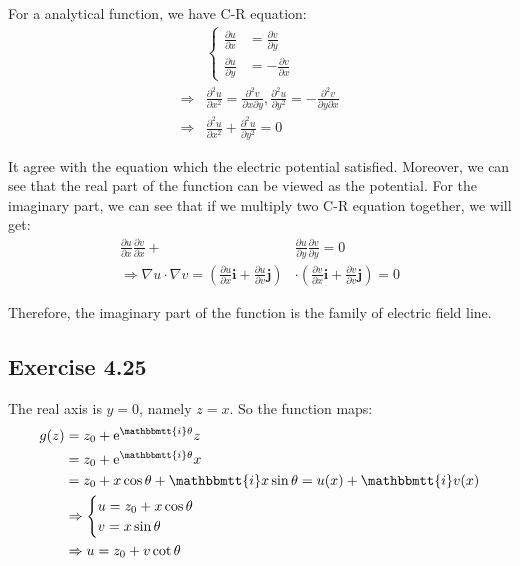 \documentclass[]{ctexart}
\newcommand{\mi}{\mathbbmtt{i}}
\newcommand{\pa}{\partial}
\newcommand{\me}{\mathrm{e}}
\begin{document}
				For a analytical function, we have C-R equation:
					\begin{equation*}
					\begin{aligned}
						&\begin{cases}
							\frac{\pa u}{\pa x}&=\frac{\pa v}{\pa y}\\
							\frac{\pa u}{\pa y}&=-\frac{\pa v}{\pa x}
						\end{cases}\\
						\Rightarrow &\frac{\pa ^2 u}{\pa x^2}=\frac{\pa ^2v}{\pa x \pa y},\frac{\pa ^2 u}{\pa y^2}=-\frac{\pa ^2v}{\pa y \pa x}\\
						\Rightarrow &\frac{\pa^2 u}{\pa x^2}+\frac{\pa^2 u}{\pa y^2}=0
					\end{aligned}
					\end{equation*}
				
				It agree with the equation which the electric potential satisfied. Moreover, we can see that the real part of the function can be viewed as the potential. For the imaginary part, we can see that if we multiply two C-R equation together, we will get:	
					\begin{equation*}
					\begin{aligned}
						\frac{\pa u}{\pa x}\frac{\pa v}{\pa x}+&\frac{\pa u}{\pa y}\frac{\pa v}{\pa y}=0\\
						\Rightarrow \nabla u\cdot \nabla v=\left(\frac{\pa u}{\pa x}\boldsymbol{i}+\frac{\pa u}{\pa v}\boldsymbol{j}\right)&\cdot \left(\frac{\pa v}{\pa x}\boldsymbol{i}+\frac{\pa v}{\pa v}\boldsymbol{j}\right)=0
					\end{aligned}
					\end{equation*}
				
				Therefore, the imaginary part of the function is the family of electric field line. 
	
	\subsection{Exercise 4.25}
		The real axis is $y=0$, namely $z=x$. So the function maps:
			\begin{equation*}
			\begin{aligned}
				g(z)&=z_0+\me ^{\mi \theta}z\\
				&=z_0+\me ^{\mi \theta}x\\
				&=z_0+x\cos \theta+\mi x \sin\theta=u(x)+\mi v(x)
			\\
			&\Rightarrow 
			\begin{cases}
				u=z_0+x\cos \theta\\
				v=x\sin\theta
			\end{cases}\\
			&\Rightarrow u=z_0+v\cot \theta
			\end{aligned}
			\end{equation*}
		
\end{document}
